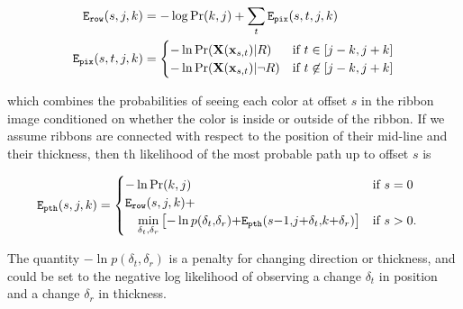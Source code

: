 \begin{align}
\mathtt{E_{row}}(s, j, k) &= -\log \Pr(k, j)  + \sum_{t} \mathtt{E_{pix}}(s,t, j, k) \\
\mathtt{E_{pix}}(s, t, j, k) &= 
\begin{cases}
 -\ln\Pr(\mathbf{X}(\mathbf{x}_{s,t})|R) &\text{if } t\in [j-k, j+k]\\
 -\ln\Pr(\mathbf{X}(\mathbf{x}_{s,t})|\neg R) &\text{if } t\not\in[j-k, j+k]
\end{cases}
\end{align}

which combines the probabilities of seeing each color at offset $s$ in the ribbon image conditioned on whether the color is inside or outside of the ribbon.
If we assume ribbons are connected with respect to the position of their mid-line and their thickness, then th likelihood of the most probable path up to offset $s$ is 

\begin{align}
\mathtt{E_{pth}}(s, j, k) &=  \begin{cases}
-\ln \Pr(k, j) & \text{if } s = 0\\
   \mathtt{E_{row}}(s, j, k){+} \\
   \hspace{1em}\displaystyle\min_{\delta_t,\delta_r} 
   \left[
   -\ln p(\delta_t{,}\delta_r){+}
   \mathtt{E_{pth}}(s{-}1{,}j{+}\delta_t{,}k{+}\delta_r)
 \right]
 & \text{if } s > 0.\\
\end{cases}
\end{align}

The quantity $-\ln p(\delta_t, \delta_r)$ is a penalty for changing direction or thickness, and could be set to the negative log likelihood of observing a change $\delta_t$ in position and a change $\delta_r$ in thickness. 




